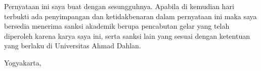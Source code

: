 \noindent Pernyataan ini saya buat dengan sesungguhnya. Apabila di kemudian hari terbukti ada penyimpangan dan ketidakbenaran dalam pernyataan ini maka saya bersedia menerima sanksi akademik berupa pencabutan gelar yang telah diperoleh karena karya saya ini, serta sanksi lain yang sesuai dengan ketentuan yang berlaku di Universitas Ahmad Dahlan.\\

\begin{flushright}
    Yogyakarta, \tglpengesahan\\[1.25cm]
    \penulis \\
    \nim
\end{flushright}
